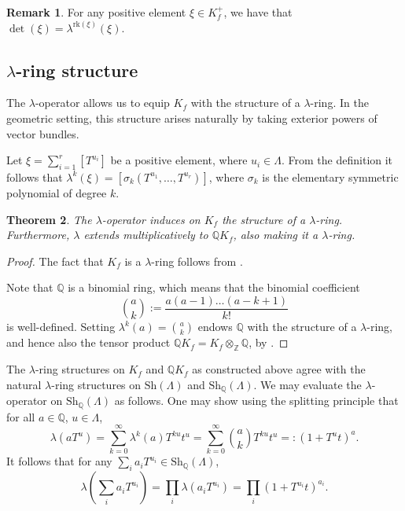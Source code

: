 \documentclass[oneside]{amsart}
\theoremstyle{plain}
\newtheorem{theorem}{Theorem}[section]
\theoremstyle{definition}
\newtheorem{remark}[theorem]{Remark}
\newcommand{\Z}{{\mathbb{Z}}}
\newcommand{\Q}{{\mathbb{Q}}}
\newcommand{\rk}{{\mathrm{rk}}}
\newcommand{\Sh}{{\mathrm{Sh}}}
\begin{document}
\begin{remark}
    For any positive element $\xi \in K_f^+$, we have that $\det(\xi) = \lambda^{\rk(\xi)}(\xi)$.
\end{remark}

\subsection{\texorpdfstring{$\lambda$}{λ}-ring structure}

The $\lambda$-operator allows us to equip $K_f$ with the structure of a $\lambda$-ring.
In the geometric setting, this structure arises naturally by taking exterior powers of vector bundles.

Let $\xi = \sum_{i = 1}^r [T^{u_i}]$ be a positive element, where $u_i \in \Lambda$.
From the definition it follows that $\lambda^k(\xi) = [\sigma_k(T^{u_1}, \dots, T^{u_r})]$,
where $\sigma_k$ is the elementary symmetric polynomial of degree $k$.

\begin{theorem}\label{thm:lambda-ring}
    The $\lambda$-operator induces on $K_f$ the structure of a $\lambda$-ring.
    Furthermore, $\lambda$ extends multiplicatively to $\Q K_f$, also making it a $\lambda$-ring.
\end{theorem}

\begin{proof}
    The fact that $K_f$ is a $\lambda$-ring follows from \cite[p. 17]{Knu73}.
    
    Note that $\Q$ is a binomial ring, which means that the binomial coefficient
    \[
        \binom{a}{k} := \frac{a(a-1) \dots (a-k + 1)}{k!}
    \]
    is well-defined. Setting $\lambda^k(a) = \binom{a}{k}$ endows $\Q$ with the structure of a $\lambda$-ring, and hence also the tensor product $\Q K_f = K_f \otimes_\Z \Q$, by \cite[p. 21]{Knu73}.
\end{proof}

The $\lambda$-ring structures on $K_f$ and $\Q K_f$ as constructed above agree with the natural $\lambda$-ring structures on $\Sh(\Lambda)$ and $\Sh_\Q(\Lambda)$. 
We may evaluate the $\lambda$-operator on $\Sh_\Q(\Lambda)$ as follows. One may show using the splitting principle that for all $a \in \Q$, $u \in \Lambda$, 
\[
    \lambda(aT^u)
    = \sum_{k=0}^\infty \lambda^k(a) T^{ku} t^u
    = \sum_{k=0}^\infty \binom{a}{k}T^{ku}t^u =: (1 + T^ut)^a.
\]
It follows that for any $\sum_i a_i T^{u_i} \in \Sh_\Q(\Lambda)$,
\begin{equation}
\label{rem:lambda-rational}
    \lambda\left(\sum_i a_iT^{u_i}\right)
    = \prod_i \lambda(a_iT^{u_i})
    = \prod_i (1 + T^{u_i}t)^{a_i}.
\end{equation}
\end{document}
